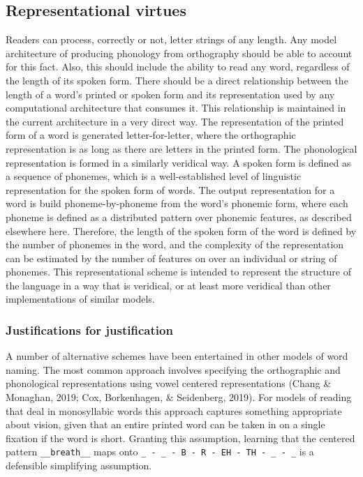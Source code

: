 \documentclass[
  american,
  man,floatsintext]{apa6}
\begin{document}
\hypertarget{representational-virtues}{%
\subsection{Representational virtues}\label{representational-virtues}}

Readers can process, correctly or not, letter strings of any length. Any model architecture of producing phonology from orthography should be able to account for this fact. Also, this should include the ability to read any word, regardless of the length of its spoken form. There should be a direct relationship between the length of a word's printed or spoken form and its representation used by any computational architecture that consumes it. This relationship is maintained in the current architecture in a very direct way. The representation of the printed form of a word is generated letter-for-letter, where the orthographic representation is as long as there are letters in the printed form. The phonological representation is formed in a similarly veridical way. A spoken form is defined as a sequence of phonemes, which is a well-established level of linguistic representation for the spoken form of words. The output representation for a word is build phoneme-by-phoneme from the word's phonemic form, where each phoneme is defined as a distributed pattern over phonemic features, as described elsewhere here. Therefore, the length of the spoken form of the word is defined by the number of phonemes in the word, and the complexity of the representation can be estimated by the number of features on over an individual or string of phonemes. This representational scheme is intended to represent the structure of the language in a way that is veridical, or at least more veridical than other implementations of similar models.

\hypertarget{justifications-for-justification}{%
\subsubsection{Justifications for justification}\label{justifications-for-justification}}

A number of alternative schemes have been entertained in other models of word naming. The most common approach involves specifying the orthographic and phonological representations using vowel centered representations (Chang \& Monaghan, 2019; Cox, Borkenhagen, \& Seidenberg, 2019). For models of reading that deal in monosyllabic words this approach captures something appropriate about vision, given that an entire printed word can be taken in on a single fixation if the word is short. Granting this assumption, learning that the centered pattern \texttt{\_\_breath\_\_} maps onto \texttt{\_\ -\ \_\ -\ B\ -\ R\ -\ EH\ -\ TH\ -\ \_\ -\ \_} is a defensible simplifying assumption.
\end{document}
